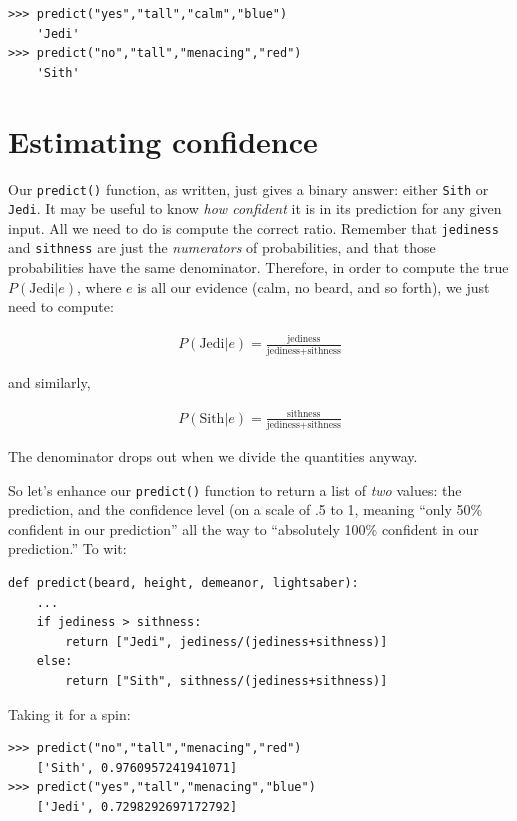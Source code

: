 \begin{Verbatim}[fontsize=\small,samepage=true,frame=single]
>>> predict("yes","tall","calm","blue")
    'Jedi'
>>> predict("no","tall","menacing","red")
    'Sith'
\end{Verbatim}


\section{Estimating confidence}

Our \texttt{predict()} function, as written, just gives a binary answer:
either \texttt{Sith} or \texttt{Jedi}. It may be useful to know \textit{how
confident} it is in its prediction for any given input. All we need to do is
compute the correct ratio. Remember that \texttt{jediness} and
\texttt{sithness} are just the \textit{numerators} of probabilities, and that
those probabilities have the same denominator. Therefore, in order to compute
the true $P(\textrm{Jedi}|e)$, where $e$ is all our evidence (calm, no beard,
and so forth), we just need to compute:

\begin{align*}
P(\textrm{Jedi}|e) = \frac{\textrm{jediness}}{\textrm{jediness} + \textrm{sithness}}
\end{align*}

and similarly, 

\begin{align*}
P(\textrm{Sith}|e) = \frac{\textrm{sithness}}{\textrm{jediness} + \textrm{sithness}}
\end{align*}

The denominator drops out when we divide the quantities anyway.

So let's enhance our \texttt{predict()} function to return a list of
\textit{two} values: the prediction, and the confidence level (on a scale of
.5 to 1, meaning ``only 50\% confident in our prediction'' all the way to
``absolutely 100\% confident in our prediction.'' To wit:

\begin{Verbatim}[fontsize=\small,samepage=true,frame=single]
def predict(beard, height, demeanor, lightsaber):
    ...
    if jediness > sithness:
        return ["Jedi", jediness/(jediness+sithness)]
    else:
        return ["Sith", sithness/(jediness+sithness)]
\end{Verbatim}

Taking it for a spin:

\begin{Verbatim}[fontsize=\small,samepage=true,frame=single]
>>> predict("no","tall","menacing","red")
    ['Sith', 0.9760957241941071]
>>> predict("yes","tall","menacing","blue")
    ['Jedi', 0.7298292697172792]
\end{Verbatim}

